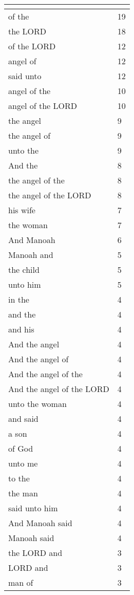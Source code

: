 \begin{center}
\begin{longtable}{|p{3.0in}|p{0.5in}|}
\hline \multicolumn{2}{c}{{ }} \\ \hline
\endfoot 
of the & 19\\ \hline 
the LORD & 18\\ \hline 
of the LORD & 12\\ \hline 
angel of & 12\\ \hline 
said unto & 12\\ \hline 
angel of the & 10\\ \hline 
angel of the LORD & 10\\ \hline 
the angel & 9\\ \hline 
the angel of & 9\\ \hline 
unto the & 9\\ \hline 
And the & 8\\ \hline 
the angel of the & 8\\ \hline 
the angel of the LORD & 8\\ \hline 
his wife & 7\\ \hline 
the woman & 7\\ \hline 
And Manoah & 6\\ \hline 
Manoah and & 5\\ \hline 
the child & 5\\ \hline 
unto him & 5\\ \hline 
in the & 4\\ \hline 
and the & 4\\ \hline 
and his & 4\\ \hline 
And the angel & 4\\ \hline 
And the angel of & 4\\ \hline 
And the angel of the & 4\\ \hline 
And the angel of the LORD & 4\\ \hline 
unto the woman & 4\\ \hline 
and said & 4\\ \hline 
a son & 4\\ \hline 
of God & 4\\ \hline 
unto me & 4\\ \hline 
to the & 4\\ \hline 
the man & 4\\ \hline 
said unto him & 4\\ \hline 
And Manoah said & 4\\ \hline 
Manoah said & 4\\ \hline 
the LORD and & 3\\ \hline 
LORD and & 3\\ \hline 
man of & 3\\ \hline 

\end{longtable}
\end{center}
